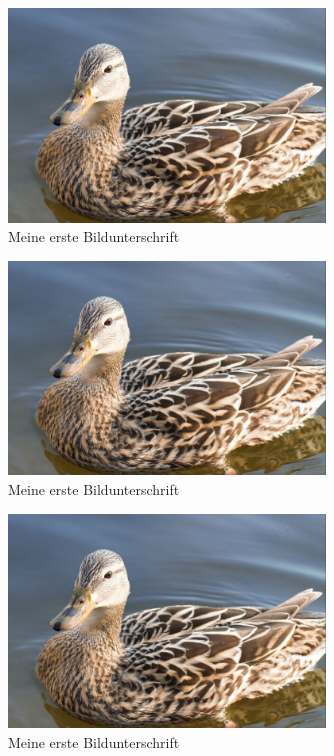 \documentclass[15pt,ngerman]{scrreprt}
\begin{document}
\begin{figure}[h]
	\begin{center}
		\includegraphics[width=0.75\textwidth]{./Bilder/image1}
	\caption{Meine erste Bildunterschrift}\label{fig:ente2}
	\end{center}
\end{figure}


\begin{figure}[h]
	\begin{center}
		\includegraphics[width=0.75\textwidth]{./Bilder/image1}
	\caption{Meine erste Bildunterschrift}\label{fig:ente3}
	\end{center}
\end{figure}


\begin{figure}[h]
	\begin{center}
		\includegraphics[width=0.75\textwidth]{./Bilder/image1}
	\caption{Meine erste Bildunterschrift}\label{fig:ente4}
	\end{center}
\end{figure}
\end{document}
